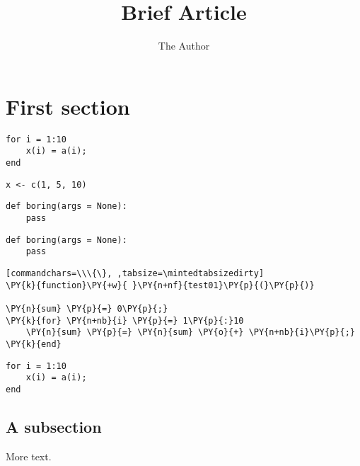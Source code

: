 \documentclass[11pt]{article} %
\title{Brief Article}
\author{The Author}
\newcommand{\mintedtabsizedirty}{4}
\begin{document}
\maketitle

\section{First section}


\begin{verbatim}
for i = 1:10
	x(i) = a(i);
end
\end{verbatim}

\begin{verbatim}
x <- c(1, 5, 10)
\end{verbatim}


\begin{verbatim}
def boring(args = None):	
	pass
\end{verbatim}

\begin{verbatim}
def boring(args = None):
    pass
\end{verbatim}

\begin{Verbatim}[commandchars=\\\{\}, ,tabsize=\mintedtabsizedirty]
\PY{k}{function}\PY{+w}{ }\PY{n+nf}{test01}\PY{p}{(}\PY{p}{)}

\PY{n}{sum} \PY{p}{=} 0\PY{p}{;}
\PY{k}{for} \PY{n+nb}{i} \PY{p}{=} 1\PY{p}{:}10
	\PY{n}{sum} \PY{p}{=} \PY{n}{sum} \PY{o}{+} \PY{n+nb}{i}\PY{p}{;}
\PY{k}{end}
\end{Verbatim}


\begin{verbatim}
for i = 1:10
	x(i) = a(i);
end
\end{verbatim}


\subsection{A subsection}

More text.
\end{document}
